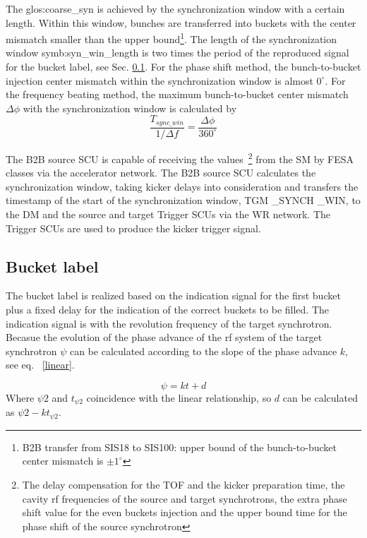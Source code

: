 The \gls{glos:coarse_syn} is achieved by the synchronization window with a certain length. Within this window, bunches are transferred into buckets with the center mismatch smaller than the upper bound\footnote{B2B transfer from SIS18 to SIS100: upper bound of the bunch-to-bucket center mismatch is $\pm1^\circ$}. The length of the synchronization window \gls{symb:syn_win_length} is two times the period of the reproduced signal for the bucket label, see Sec. \ref{sec:bucket_label}. For the phase shift method, the bunch-to-bucket injection center mismatch within the synchronization window is almost $0^\circ$. For the frequency beating method, the maximum bunch-to-bucket center mismatch $\Delta \phi$ with the synchronization window is calculated by 
\begin{equation}
\frac{T_{\mathit{sync\_win}}}{1/\Delta f}= \frac{\Delta \phi}{360^\circ}
\end{equation}

The B2B source SCU is capable of receiving the values~\footnote{The delay compensation for the TOF and the kicker preparation time, the cavity rf frequencies of the source and target synchrotrons, the extra phase shift value for the even buckets injection and the upper bound time for the phase shift of the source synchrotron} from the SM by FESA classes via the accelerator network. The B2B source SCU calculates the synchronization window, taking kicker delays into consideration and transfers the timestamp of the start of the synchronization window, TGM \_SYNCH \_WIN, to the DM and the source and target Trigger SCUs via the WR network. The Trigger SCUs are used to produce the kicker trigger signal. 

\subsection{Bucket label}
\label{sec:bucket_label}
The bucket label is realized based on the indication signal for the first bucket plus a fixed delay for the indication of the correct buckets to be filled. The indication signal is with the revolution frequency of the target synchrotron. Becasue the evolution of the phase advance of the rf system of the target synchrotron $\psi$ can be calculated according to the slope of the phase advance $k$, see eq. ~\ref{linear}.  

\begin{equation}
\psi= kt+d\label{linear}
\end{equation}
Where $\psi2$ and $t_{\psi2}$ coincidence with the linear relationship, so $d$ can be calculated as $\psi2-kt_{\psi2}$.


